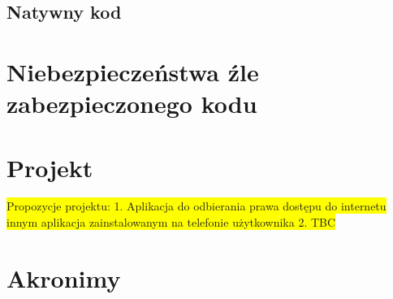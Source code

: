 \documentclass[12pt,a4paper,leqno,oneside,titlepage]{book}
\newcommand{\todo}[1]{\colorbox{yellow}{#1}}
\begin{document}
\section{Natywny kod}



\chapter{Niebezpieczeństwa źle zabezpieczonego kodu}

\chapter{Projekt}
\todo{Propozycje projektu: 1. Aplikacja do odbierania prawa dostępu do internetu innym aplikacja zainstalowanym na telefonie użytkownika 2. TBC}

\newpage




\chapter*{Akronimy}
\begin{acronym}
\end{acronym}
\end{document}
